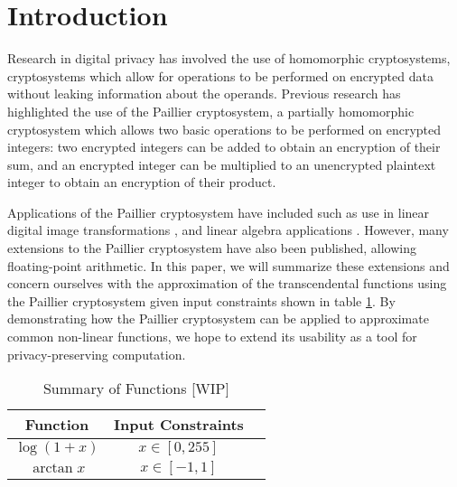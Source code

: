 \section{Introduction}
Research in digital privacy has involved the use of homomorphic cryptosystems, cryptosystems which allow for operations to be performed on encrypted data without leaking information about the operands.
Previous research has highlighted the use of the Paillier cryptosystem, a partially homomorphic cryptosystem which allows two basic operations to be performed on encrypted integers: two encrypted integers can be added to obtain an encryption of their sum, and an encrypted integer can be multiplied to an unencrypted plaintext integer to obtain an encryption of their product.

Applications of the Paillier cryptosystem have included such as use in linear digital image transformations \cite{ziad_cryptoimg:_2016}, and linear algebra applications \cite{hutchison_privacy-preserving_2009}. However, many extensions to the Paillier cryptosystem have also been published, allowing floating-point arithmetic. In this paper, we will summarize these extensions and concern ourselves with the approximation of the transcendental functions using the Paillier cryptosystem given input constraints shown in table \ref{tab:inputconstraints}. By demonstrating how the Paillier cryptosystem can be applied to approximate common non-linear functions, we hope to extend its usability as a tool for privacy-preserving computation.
\begin{table}
	\caption{Summary of Functions [WIP]}
	\label{tab:inputconstraints}
	\begin{tabular}{ccl}
		\toprule
		Function & Input Constraints\\
		\midrule
		$\log(1+x)$ & $x\in[0,255]$\\
		$\arctan x$ & $x\in[-1,1]$\\
	\bottomrule
\end{tabular}
\end{table}
